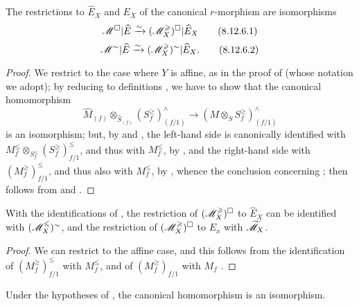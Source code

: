\begin{proposition}[8.12.6]
\label{II.8.12.6}
The restrictions to $\widehat{E}_X$ and $E_X$ of the canonical $r$-morphism  are isomorphisms
\[
\label{II.8.12.6.1}
    \mathscr{M}^\square|\widehat{E} \xrightarrow{\sim} (\mathscr{M}_X^\geqslant)^\square|\widehat{E}_X
\tag{8.12.6.1}
\]
\[
\label{II.8.12.6.2}
    \mathscr{M}^\sim|\widehat{E} \xrightarrow{\sim} (\mathscr{M}_X^\geqslant)^\sim|\widehat{E}_X.
\tag{8.12.6.2}
\]
\end{proposition}

\begin{proof}
\label{proof-2.8.12.6}
We restrict to the case where $Y$ is affine, as in the proof of  (whose notation we adopt);
by reducing to definitions , we have to show that the canonical homomorphism
\[
    \widehat{M}_{(f)}\otimes_{\widehat{S}_{(f)}}(S_f^\geq)_{(f/1)}^\wedge \to (M\otimes_S S_f^\geq)_{(f/1)}^\wedge
\]
is an isomorphism;
but, by  and , the left-hand side is canonically identified with $M_f^\leq\otimes_{S_f^\leq}(S_f^\geq)_{f/1}^\leq$, and thus with $M_f^\leq$, by , and the right-hand side with $(M_f^\geq)_{f/1}^\leq$, and thus also with $M_f^\leq$, by , whence the conclusion concerning ;
 then follows from  and .
\end{proof}

\begin{corollary}[8.12.7]
\label{II.8.12.7}
With the identifications of , the restriction of $(\mathscr{M}_X^\geqslant)^\square$ to $\widehat{E}_X$ can be identified with $(\mathscr{M}_X^\leqslant)^\sim$, and the restriction of $(\mathscr{M}_X^\geqslant)^\square$ to $E_x$ with $\widetilde{\mathscr{M}}_X$.
\end{corollary}

\begin{proof}
\label{proof-2.8.12.7}
We can restrict to the affine case, and this follows from the identification of $(M_f^\geq)_{f/1}^\leq$ with $M_f^\leq$, and of $(M_f^\geq)_{f/1}$ with $M_f$ .
\end{proof}

\begin{proposition}[8.12.8]
\label{II.8.12.8}
Under the hypotheses of , the canonical homomorphism  is an isomorphism.
\end{proposition}

